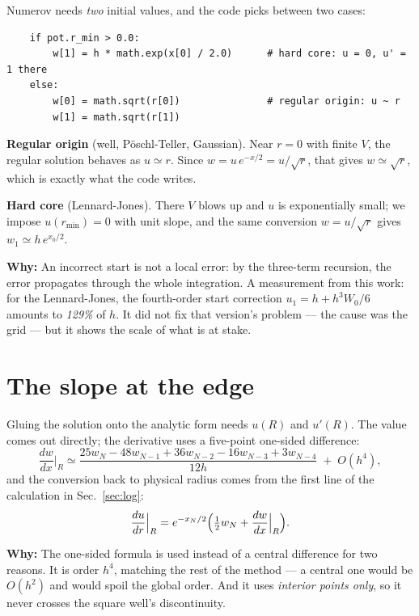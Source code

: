 \documentclass[11pt,a4paper]{article}
\newcommand{\why}[1]{\medskip\noindent\textbf{Why:} #1\medskip}
\begin{document}
Numerov needs \emph{two} initial values, and the code picks between two cases:

\begin{lstlisting}
    if pot.r_min > 0.0:
        w[1] = h * math.exp(x[0] / 2.0)      # hard core: u = 0, u' = 1 there
    else:
        w[0] = math.sqrt(r[0])               # regular origin: u ~ r
        w[1] = math.sqrt(r[1])
\end{lstlisting}

\textbf{Regular origin} (well, Pöschl-Teller, Gaussian). Near $r=0$ with finite
$V$, the regular solution behaves as $u \simeq r$. Since
$w = u\,e^{-x/2} = u/\sqrt{r}$, that gives $w \simeq \sqrt{r}$, which is exactly
what the code writes.

\textbf{Hard core} (Lennard-Jones). There $V$ blows up and $u$ is exponentially
small; we impose $u(r_{\min}) = 0$ with unit slope, and the same conversion
$w = u/\sqrt{r}$ gives $w_1 \simeq h\,e^{x_0/2}$.

\why{An incorrect start is not a local error: by the three-term
recursion, the error propagates through the whole integration. A measurement
from this work: for the Lennard-Jones, the fourth-order start correction
$u_1 = h + h^3W_0/6$ amounts to \emph{129\%} of $h$. It did not fix that
version's problem --- the cause was the grid --- but it shows the scale of what
is at stake.}

\section{The slope at the edge}
\label{sec:slope}

Gluing the solution onto the analytic form needs $u(R)$ and $u'(R)$. The value
comes out directly; the derivative uses a five-point one-sided difference:
\begin{equation}
  \frac{dw}{dx}\Big|_{R} \simeq
  \frac{25w_{N} - 48w_{N-1} + 36w_{N-2} - 16w_{N-3} + 3w_{N-4}}{12h}
  \;+\; O(h^4),
\end{equation}
and the conversion back to physical radius comes from the first line of the
calculation in Sec.~\ref{sec:log}:
\begin{equation}
  \frac{du}{dr}\Big|_{R} = e^{-x_N/2}\Bigl(\tfrac12 w_N + \frac{dw}{dx}\Big|_R\Bigr).
\end{equation}

\why{The one-sided formula is used instead of a central difference for two reasons. It
is order $h^4$, matching the rest of the method --- a central one would be
$O(h^2)$ and would spoil the global order. And it uses \emph{interior points
only}, so it never crosses the square well's discontinuity.}
\end{document}
